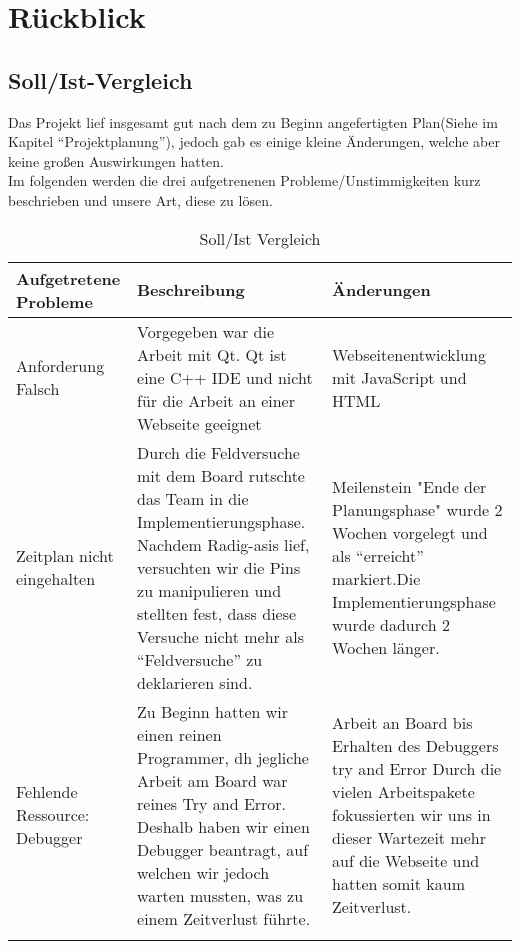 
\chapter{Rückblick}

\section{Soll/Ist-Vergleich}
Das Projekt lief insgesamt gut nach dem zu Beginn angefertigten Plan(Siehe im Kapitel "`Projektplanung"'), jedoch gab es 
einige kleine Änderungen, welche aber keine großen Auswirkungen hatten. \\
Im folgenden werden die drei aufgetrenenen Probleme/Unstimmigkeiten kurz beschrieben und unsere 
Art, diese zu lösen.
\begin{center} %

\begin{longtable}{|>{\raggedright \arraybackslash}p{4.0cm}|
>{\raggedright \arraybackslash}p{4.0cm}|>{\raggedright \arraybackslash}p{4.0cm}|}

\hline
Aufgetretene Probleme & Beschreibung & Änderungen \\ \hline
Anforderung Falsch & Vorgegeben war die Arbeit mit Qt.\linebreak
Qt ist eine C++ IDE und nicht 
für die Arbeit an einer Webseite geeignet & Webseitenentwicklung mit JavaScript und HTML\\ \hline
Zeitplan nicht eingehalten & Durch die Feldversuche mit dem Board rutschte das Team in die Implementierungsphase. 
\linebreak Nachdem Radig-asis lief, versuchten wir die Pins zu manipulieren und stellten fest, dass diese Versuche 
nicht mehr als "`Feldversuche"' zu deklarieren sind. & Meilenstein "Ende der Planungsphase" wurde 2 Wochen vorgelegt und 
als "`erreicht"' markiert.\linebreak Die Implementierungsphase wurde dadurch 2 Wochen länger. \\ \hline
Fehlende Ressource: \linebreak Debugger & Zu Beginn hatten wir einen reinen Programmer, dh jegliche Arbeit am Board war reines 
Try and Error. \linebreak Deshalb haben wir einen Debugger beantragt, auf welchen wir jedoch warten mussten, was zu einem 
Zeitverlust führte. & Arbeit an Board bis Erhalten des Debuggers try and Error \linebreak Durch die vielen Arbeitspakete fokussierten 
wir uns in dieser Wartezeit mehr auf die Webseite und hatten somit kaum Zeitverlust. \\ \hline
\caption{Soll/Ist Vergleich}
\end{longtable}
\end{center}

